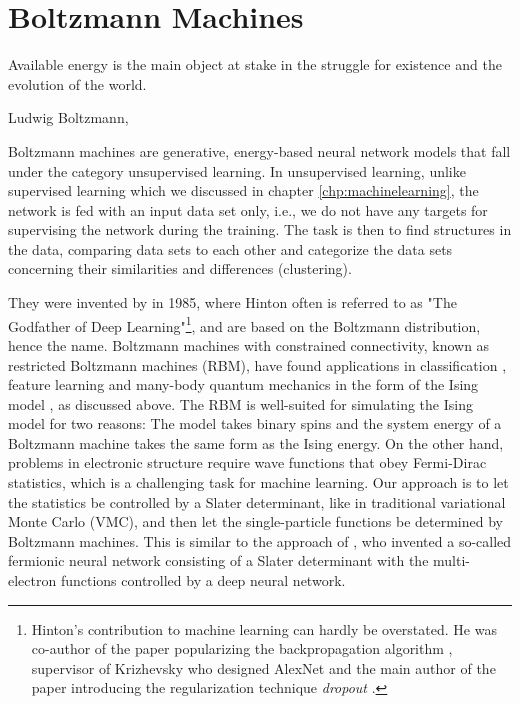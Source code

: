 \chapter{Boltzmann Machines} \label{chp:restricted}
\epigraph{Available energy is the main object at stake in the struggle for existence and the evolution of the world.}{Ludwig Boltzmann, \cite{rajasekar_ludwig_2006}}
\iffalse
\begin{figure}[H]
	\centering
	\texttt{[image: Images/example.png]}
	\caption{Caption}
\end{figure}
\fi

Boltzmann machines are generative, energy-based neural network models that fall under the category unsupervised learning. In unsupervised learning, unlike supervised learning which we discussed in chapter \ref{chp:machinelearning}, the network is fed with an input data set only, i.e., we do not have any targets for supervising the network during the training. The task is then to find structures in the data, comparing data sets to each other and categorize the data sets concerning their similarities and differences (clustering).

They were invented by \citet{ackley_learning_1985} in 1985, where Hinton often is referred to as "The Godfather of Deep Learning"\footnote{Hinton's contribution to machine learning can hardly be overstated. He was co-author of the paper popularizing the backpropagation algorithm \cite{rumelhart_learning_1986}, supervisor of Krizhevsky who designed AlexNet \cite{krizhevsky_imagenet_2012} and the main author of the paper introducing the regularization technique \textit{dropout} \cite{hinton_improving_2012}.}, and are based on the Boltzmann distribution, hence the name. Boltzmann machines with constrained connectivity, known as restricted Boltzmann machines (RBM), have found applications in classification \cite{larochelle_classification_2008}, feature learning \cite{coates_analysis_2011} and many-body quantum mechanics in the form of the Ising model \cite{carleo_solving_2017}, as discussed above. The RBM is well-suited for simulating the Ising model for two reasons: The model takes binary spins and the system energy of a Boltzmann machine takes the same form as the Ising energy. On the other hand, problems in electronic structure require wave functions that obey Fermi-Dirac statistics, which is a challenging task for machine learning. Our approach is to let the statistics be controlled by a Slater determinant, like in traditional variational Monte Carlo (VMC), and then let the single-particle functions be determined by Boltzmann machines. This is similar to the approach of \citet{pfau2019abinitio}, who invented a so-called fermionic neural network consisting of a Slater determinant with the multi-electron functions controlled by a deep neural network. 

